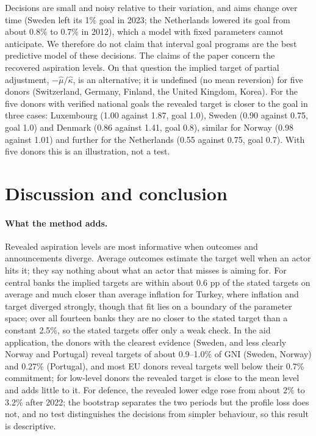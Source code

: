 \documentclass[pdflatex,sn-basic]{sn-jnl}
\theoremstyle{thmstyleone}\newtheorem{proposition}{Proposition}\newtheorem{theorem}{Theorem}
\theoremstyle{thmstylethree}\newtheorem{remark}{Remark}
\begin{document}
Decisions are small and noisy relative to their variation, and aims change over time (Sweden left its 1\% goal in 2023; the Netherlands lowered its goal from about 0.8\% to 0.7\% in 2012), which a model with fixed parameters cannot anticipate. We therefore do not claim that interval goal programs are the best predictive model of these decisions. The claims of the paper concern the recovered aspiration levels. On that question the implied target of partial adjustment, $-\hat\mu/\hat\kappa$, is an alternative; it is undefined (no mean reversion) for five donors (Switzerland, Germany, Finland, the United Kingdom, Korea). For the five donors with verified national goals the revealed target is closer to the goal in three cases: Luxembourg (1.00 against 1.87, goal 1.0), Sweden (0.90 against 0.75, goal 1.0) and Denmark (0.86 against 1.41, goal 0.8), similar for Norway (0.98 against 1.01) and further for the Netherlands (0.55 against 0.75, goal 0.7). With five donors this is an illustration, not a test.
\begin{table}[t]\centering\small
\caption{Out-of-sample mean absolute decision error of the goal program (GP), linear partial adjustment or difference Taylor rule (PA), always holding, and the median change; last column: number of units for which GP has the lowest error.}\label{tab:mcomp}\end{table}

\section{Discussion and conclusion}\label{sec:disc}
\paragraph{What the method adds.} Revealed aspiration levels are most informative when outcomes and announcements diverge. Average outcomes estimate the target well when an actor hits it; they say nothing about what an actor that misses is aiming for. For central banks the implied targets are within about 0.6 pp of the stated targets on average and much closer than average inflation for Turkey, where inflation and target diverged strongly, though that fit lies on a boundary of the parameter space; over all fourteen banks they are no closer to the stated target than a constant 2.5\%, so the stated targets offer only a weak check. In the aid application, the donors with the clearest evidence (Sweden, and less clearly Norway and Portugal) reveal targets of about 0.9--1.0\% of GNI (Sweden, Norway) and 0.27\% (Portugal), and most EU donors reveal targets well below their 0.7\% commitment; for low-level donors the revealed target is close to the mean level and adds little to it. For defence, the revealed lower edge rose from about 2\% to 3.2\% after 2022; the bootstrap separates the two periods but the profile loss does not, and no test distinguishes the decisions from simpler behaviour, so this result is descriptive.
\end{document}
